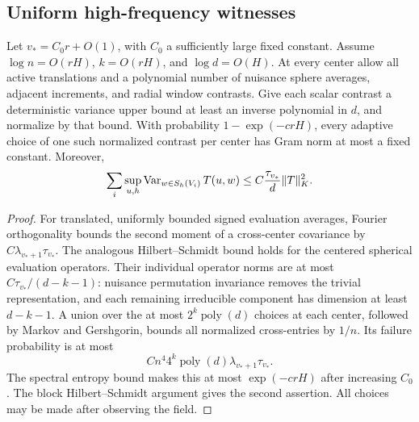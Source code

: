 \subsection{Uniform high-frequency witnesses}
\begin{lemma}
\label{lem:fine-cell-gram}
Let $v_*=C_0r+O(1)$, with $C_0$ a sufficiently large fixed constant.
Assume $\log n=O(rH)$, $k=O(rH)$, and $\log d=O(H)$.
At every center allow all active translations and a polynomial number
of nuisance sphere averages, adjacent increments, and radial window
contrasts. Give each scalar contrast a deterministic variance upper
bound at least an inverse polynomial in $d$, and normalize by that bound.
With probability $1-\exp(-crH)$, every adaptive choice of one such
normalized contrast per center has Gram norm at most a fixed constant.
Moreover,
\[
 \sum_i\sup_{u,h}\operatorname{Var}_{w\in S_h(V_i)}T(u,w)
       \le C\frac{\tau_{v_*}}d\|T\|_K^2.
\]
\end{lemma}
\begin{proof}
For translated, uniformly bounded signed evaluation averages, Fourier
orthogonality bounds the second moment of a cross-center covariance by
$C\lambda_{v_*+1}\tau_{v_*}$. The analogous Hilbert--Schmidt bound holds
for the centered spherical evaluation operators. Their individual
operator norms are at most $C\tau_{v_*}/(d-k-1)$: nuisance permutation
invariance removes the trivial representation, and each remaining
irreducible component has dimension at least $d-k-1$.
A union over the at most $2^k\operatorname{poly}(d)$ choices at each
center, followed by Markov and Gershgorin, bounds all normalized
cross-entries by $1/n$. Its failure probability is at most
\[
 Cn^4 4^k\operatorname{poly}(d)
                 \lambda_{v_*+1}\tau_{v_*}.
\]
The spectral entropy bound makes this at most $\exp(-crH)$ after
increasing $C_0$. The block Hilbert--Schmidt argument gives the second
assertion. All choices may be made after observing the field.
\end{proof}

